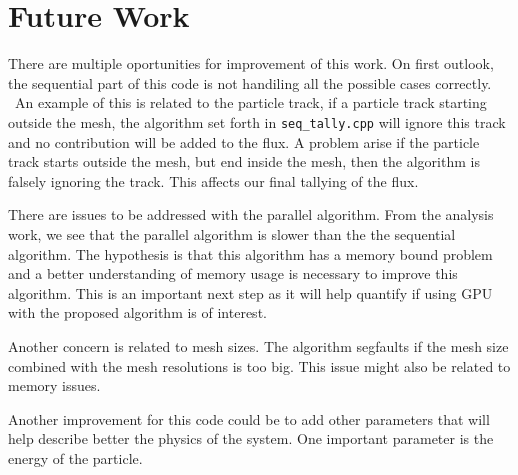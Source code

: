 \section{Future Work}
There are multiple oportunities for improvement of this work. On first outlook, 
the sequential part of this code is not handiling all the possible cases correctly. \
An example of this is related to the particle track, if a particle track starting 
outside the mesh, the algorithm set forth in \texttt{seq\_tally.cpp} will ignore this 
track and no contribution will be added to the flux. 
A problem arise if the particle track starts outside the mesh, but end inside the mesh, 
then the algorithm is falsely ignoring the track. This affects our final tallying of the 
flux. 


There are issues to be addressed with the parallel algorithm. 
From the analysis work, we see that the parallel algorithm is slower than the 
the sequential algorithm. The hypothesis is that this algorithm has a memory 
bound problem and a better understanding of memory usage is necessary to improve 
this algorithm. This is an important next step as it will help quantify if using GPU 
with the proposed algorithm is of interest.  

Another concern is related to mesh sizes. The algorithm segfaults if the mesh size 
combined with the mesh resolutions is too big. This issue might also be related to 
memory issues. 

Another improvement for this code could be to add other parameters that will help 
describe better the physics of the system. One important parameter is the 
energy of the particle. 

